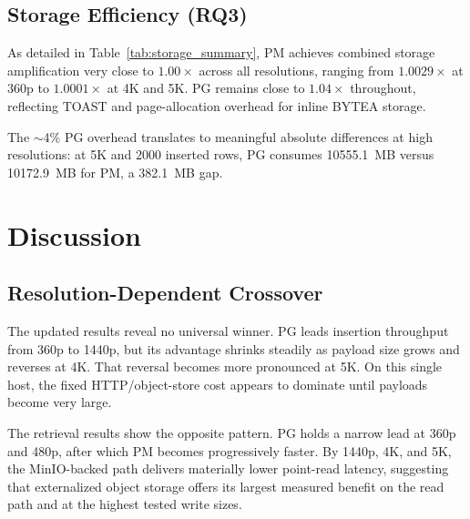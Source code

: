 \documentclass[conference]{IEEEtran}
\begin{document}
\subsection{Storage Efficiency (RQ3)}
\label{subsec:storage_size}
As detailed in Table~\ref{tab:storage_summary}, PM achieves combined storage amplification very close to $1.00\times$ across all resolutions, ranging from $1.0029\times$ at 360p to $1.0001\times$ at 4K and 5K. PG remains close to $1.04\times$ throughout, reflecting TOAST and page-allocation overhead for inline BYTEA storage.

The $\sim$4\% PG overhead translates to meaningful absolute differences at high resolutions: at 5K and 2000 inserted rows, PG consumes 10555.1~MB versus 10172.9~MB for PM, a 382.1~MB gap.


\section{Discussion}
\label{sec:discussion}

\subsection{Resolution-Dependent Crossover}
The updated results reveal no universal winner. PG leads insertion throughput from 360p to 1440p, but its advantage shrinks steadily as payload size grows and reverses at 4K. That reversal becomes more pronounced at 5K. On this single host, the fixed HTTP/object-store cost appears to dominate until payloads become very large.

The retrieval results show the opposite pattern. PG holds a narrow lead at 360p and 480p, after which PM becomes progressively faster. By 1440p, 4K, and 5K, the MinIO-backed path delivers materially lower point-read latency, suggesting that externalized object storage offers its largest measured benefit on the read path and at the highest tested write sizes.
\end{document}
